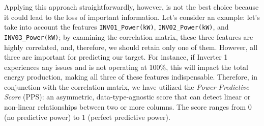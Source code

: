 Applying this approach straightforwardly, however, is not the best choice because it
could lead to the loss of important information.
Let's consider an example: let's take into account the features \verb|INV01_Power(kW)|,
\verb|INV02_Power(kW)|, and \verb|INV03_Power(kW)|; by examining the correlation matrix, these
three features are highly correlated, and, therefore, we should retain only one of them.
However, all three are important for predicting our target.
For instance, if Inverter 1 experiences any issues and is not operating at 100\%,
this will impact the total energy production, making all three of these
features indispensable. Therefore, in conjunction with the correlation matrix,
we have utilized the \textit{Power Predictive Score} (PPS): an asymmetric,
data-type-agnostic score that can detect linear or non-linear relationships
between two or more columns\cite{pps}. The score ranges from 0 (no predictive power)
to 1 (perfect predictive power)\cite{pps}.

